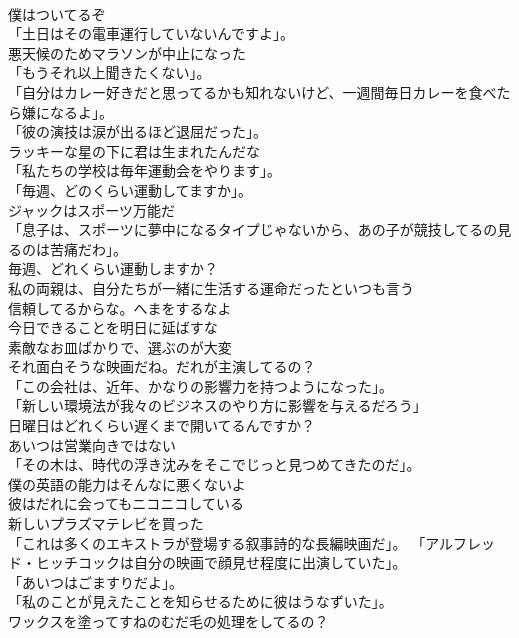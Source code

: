 \documentclass[8pt]{extreport}
\begin{document}
\begin{CJK}{UTF8}{min}
\\	僕はついてるぞ	
\\	「土日はその電車運行していないんですよ」。	
\\	悪天候のためマラソンが中止になった	
\\	「もうそれ以上聞きたくない」。	
\\	「自分はカレー好きだと思ってるかも知れないけど、一週間毎日カレーを食べたら嫌になるよ」。	
\\	「彼の演技は涙が出るほど退屈だった」。	
\\	ラッキーな星の下に君は生まれたんだな	
\\	「私たちの学校は毎年運動会をやります」。	
\\	「毎週、どのくらい運動してますか」。	
\\	ジャックはスポーツ万能だ	
\\	「息子は、スポーツに夢中になるタイプじゃないから、あの子が競技してるの見るのは苦痛だわ」。	
\\	毎週、どれくらい運動しますか？	
\\	私の両親は、自分たちが一緒に生活する運命だったといつも言う	
\\	信頼してるからな。へまをするなよ	
\\	今日できることを明日に延ばすな	
\\	素敵なお皿ばかりで、選ぶのが大変	
\\	それ面白そうな映画だね。だれが主演してるの？	
\\	「この会社は、近年、かなりの影響力を持つようになった」。	
\\	「新しい環境法が我々のビジネスのやり方に影響を与えるだろう」	
\\	日曜日はどれくらい遅くまで開いてるんですか？	
\\	あいつは営業向きではない	
\\	「その木は、時代の浮き沈みをそこでじっと見つめてきたのだ」。	
\\	僕の英語の能力はそんなに悪くないよ	
\\	彼はだれに会ってもニコニコしている	
\\	新しいプラズマテレビを買った	
\\	「これは多くのエキストラが登場する叙事詩的な長編映画だ」。 「アルフレッド・ヒッチコックは自分の映画で顔見せ程度に出演していた」。	
\\	「あいつはごますりだよ」。	
\\	「私のことが見えたことを知らせるために彼はうなずいた」。	
\\	ワックスを塗ってすねのむだ毛の処理をしてるの？	

\end{CJK}
\end{document}
